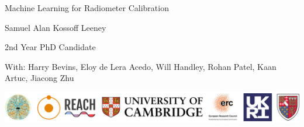 \documentclass[aspectratio=169]{beamer}
\begin{document}
\begin{frame}
	\begin{center}
		{\huge Machine Learning for Radiometer Calibration\par}
		\vspace{0.5cm}


		{\large Samuel Alan Kossoff Leeney\par}

		{\small 2nd Year PhD Candidate\par}
		\vspace{0.5cm}


		{\footnotesize With: Harry Bevins, Eloy de Lera Acedo, Will Handley, Rohan Patel, Kaan Artuc, Jiacong Zhu \par}

		\vfill

		\includegraphics[width=1\textwidth]{images/affiliations.png}


	\end{center}
	\vfill
\end{frame}

\end{document}
